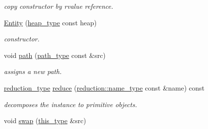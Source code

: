 \begin{DoxyCompactItemize}
\begin{DoxyCompactList}\small\item\em copy constructor by rvalue reference. \end{DoxyCompactList}\item 
\hypertarget{classhryky_1_1uri_1_1hierarchy_1_1_entity_aafe9dba3ae19ea7c0ec752c7aedce9f2}{\hyperlink{classhryky_1_1uri_1_1hierarchy_1_1_entity_aafe9dba3ae19ea7c0ec752c7aedce9f2}{Entity} (\hyperlink{classhryky_1_1memory_1_1heap_1_1_base}{heap\-\_\-type} const heap)}\label{classhryky_1_1uri_1_1hierarchy_1_1_entity_aafe9dba3ae19ea7c0ec752c7aedce9f2}

\begin{DoxyCompactList}\small\item\em constructor. \end{DoxyCompactList}\item 
\hypertarget{classhryky_1_1uri_1_1hierarchy_1_1_entity_a0465777a71cb4f77f15afd783bcdded0}{void \hyperlink{classhryky_1_1uri_1_1hierarchy_1_1_entity_a0465777a71cb4f77f15afd783bcdded0}{path} (\hyperlink{classhryky_1_1uri_1_1path_1_1_entity}{path\-\_\-type} const \&src)}\label{classhryky_1_1uri_1_1hierarchy_1_1_entity_a0465777a71cb4f77f15afd783bcdded0}

\begin{DoxyCompactList}\small\item\em assigns a new path. \end{DoxyCompactList}\item 
\hypertarget{classhryky_1_1uri_1_1hierarchy_1_1_entity_add6132690899d4e6d7b7861adf5bec19}{\hyperlink{namespacehryky_a343a9a4c36a586be5c2693156200eadc}{reduction\-\_\-type} \hyperlink{classhryky_1_1uri_1_1hierarchy_1_1_entity_add6132690899d4e6d7b7861adf5bec19}{reduce} (\hyperlink{namespacehryky_1_1reduction_ac686c30a4c8d196bbd0f05629a6b921f}{reduction\-::name\-\_\-type} const \&name) const }\label{classhryky_1_1uri_1_1hierarchy_1_1_entity_add6132690899d4e6d7b7861adf5bec19}

\begin{DoxyCompactList}\small\item\em decomposes the instance to primitive objects. \end{DoxyCompactList}\item 
\hypertarget{classhryky_1_1uri_1_1hierarchy_1_1_entity_af253b8e96067061dff5d5ae6ff2e4b32}{void \hyperlink{classhryky_1_1uri_1_1hierarchy_1_1_entity_af253b8e96067061dff5d5ae6ff2e4b32}{swap} (\hyperlink{classhryky_1_1uri_1_1hierarchy_1_1_entity_a75ba54ddfefb82538bddab2df6946e4b}{this\-\_\-type} \&src)}\label{classhryky_1_1uri_1_1hierarchy_1_1_entity_af253b8e96067061dff5d5ae6ff2e4b32}


\end{DoxyCompactItemize}
